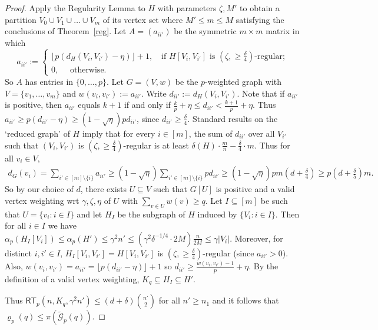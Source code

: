 \documentclass[11pt, a4paper]{article}
\theoremstyle{definition}
\def\de{{\delta}}
\newcommand{\cG}{\mathcal{G}}
\newcommand{\rt}{{\mathsf{RT}}}
\begin{document}
\begin{proof}
	Apply the Regularity Lemma to $H$ with parameters $\zeta,M'$
	to obtain a partition $V_0 \cup V_1 \cup \ldots \cup V_m$ of its vertex set where $M' \leq m \leq M$ satisfying the conclusions of Theorem~\ref{reg}.
	Let $A = (a_{ii'})$ be the symmetric $m\times m$ matrix in which
	$$
	a_{ii'} := 
	\begin{cases}
		\lfloor p(d_H(V_i,V_{i'})-\eta)\rfloor+1, \quad\mbox{if } H[V_i,V_{i'}] \text{ is } (\zeta,\geq\!\frac{\delta}{4})\text{-regular};\\
		0, \quad\mbox{ otherwise.} 
	\end{cases}
	$$
	So $A$ has entries in $\{0,\ldots,p\}$.
	Let $G=(V,w)$ be the $p$-weighted graph with $V = \{v_1,\ldots,v_m\}$ and $w(v_i,v_{i'}) := a_{ii'}$.
	Write $d_{ii'} := d_H(V_i,V_{i'})$.
	Note that if $a_{ii'}$ is positive, then $a_{ii'}$ equals $k+1$ if and only if $\frac{k}{p}+\eta \leq d_{ii'} < \frac{k+1}{p}+\eta$.
	Thus $a_{ii'}\geq p(d_{ii'}-\eta) \geq (1-\sqrt{\eta})pd_{ii'}$, since $d_{ii'} \geq \frac{\delta}{4}$.
	Standard results on the `reduced graph' of $H$ imply that for every $i \in [m]$, the sum of $d_{ii'}$ over all $V_{i'}$ such that $(V_i,V_{i'})$ is $(\zeta,\geq\!\frac{\delta}{4})$-regular is at least $\delta(H)\cdot\frac{m}{n}-\frac{\delta}{4}\cdot  m$.
	Thus for all $v_i \in V$,
	\begin{align}\label{eq:gA}
		d_G(v_i) = \sum_{i' \in [m]\setminus\{i\}}a_{ii'} \geq (1-\sqrt{\eta})\sum_{i' \in [m]\setminus\{i\}}pd_{ii'} \geq (1-\sqrt{\eta})pm\left(d+\frac{\delta}{4}\right) \geq p\left(d+\frac{\delta}{5}\right)m.
	\end{align}
	So by our choice of $d$, there exists $U \subseteq V$ such that $G[U]$ is positive and a valid vertex weighting wrt $\gamma,\zeta,\eta$ of $U$ with $\sum_{v \in U}w(v) \geq q$.
	Let $I \subseteq [m]$ be such that $U = \{v_i: i \in I\}$ and let $H_I$ be the subgraph of $H$ induced by $\{V_i: i \in I\}$.
	Then for all $i \in I$ we have $\alpha_p(H_I[V_i])\le \alpha_p(H') \leq \gamma^2 n'\le  (\gamma^2 \de^{-1/4}\cdot 2M)\frac{n}{2M}\leq  \gamma|V_i|$.
	Moreover, for distinct $i,i' \in I$, $H_I[V_i,V_{i'}] = H[V_i,V_{i'}]$ is $(\zeta,\geq\!\frac{\delta}{4})$-regular (since $a_{ii'}>0$).
	Also, $w(v_i,v_{i'})=a_{ii'}=\lfloor p(d_{ii'}-\eta)\rfloor + 1$ so $d_{ii'}\geq \frac{w(v_i,v_{i'})-1}{p}+\eta$.
	By the definition of a valid vertex weighting, $K_q \subseteq H_I\subseteq H'$.
	
	Thus $\rt_p(n,K_q,\gamma^2 n') \leq (d+\delta)\binom{n'}{2}$ for all $n' \geq n_1$ and it follows that $\varrho_p(q) \leq \pi(\widetilde{\cG}_p(q))$.
\end{proof}
\end{document}
